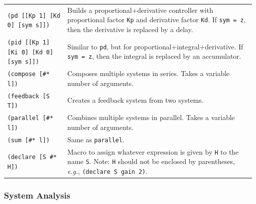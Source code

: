 \documentclass[11pt,letter]{article}
\begin{document}
\begin{longtable}{ p{} p{} }
  \texttt{(pd [[Kp 1] [Kd 0] [sym s]])}
  &
  Builds a proportional+derivative controller with proportional factor \lstinline!Kp! and derivative factor \lstinline!Kd!.
  If \lstinline!sym = z!, then the derivative is replaced by a delay. \\

  \texttt{(pid [[Kp 1] [Ki 0] [Kd 0] [sym s]])}
  &
  Similar to \lstinline!pd!, but for proportional+integral+derivative.
  If \lstinline!sym = z!, then the integral is replaced by an accumulator. \\

  \texttt{(compose [\#* l])}
  &
  Composes multiple systems in series. Takes a variable number of arguments. \\

  \texttt{(feedback [S T])}
  &
  Creates a feedback system from two systems. \\

  \texttt{(parallel [\#* l])}
  &
  Combines multiple systems in parallel. Takes a variable number of arguments. \\

  \texttt{(sum [\#* l])}
  &
  Same as \texttt{parallel}. \\

  \texttt{(declare [S \#* H])}
  &
  Macro to assign whatever expression is given by \texttt{H} to the name \texttt{S}.
  Note: \texttt{H} should not be enclosed by parentheses, \textit{e.g.}, \texttt{(declare S gain 2)}. \\

\end{longtable}

\subsubsection{System Analysis}
\end{document}
